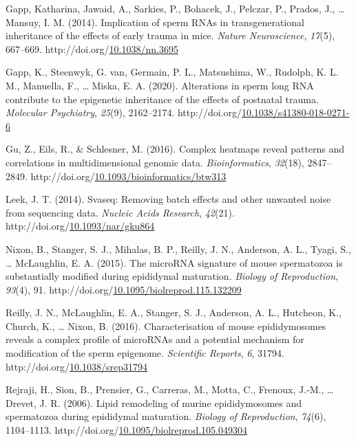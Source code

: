 \documentclass[12pt,twoside]{reedthesis}
\newlength{\cslhangindent}
\newenvironment{CSLReferences}[2] %
 {%
  \setlength{\parindent}{0pt}
  \ifodd #1 \everypar{\setlength{\hangindent}{\cslhangindent}}\ignorespaces\fi
  \ifnum #2 > 0
  \setlength{\parskip}{#2\baselineskip}
  \fi
 }%
 {}
\begin{document}
\begin{CSLReferences}{1}{0}
\leavevmode{}%
Gapp, Katharina, Jawaid, A., Sarkies, P., Bohacek, J., Pelczar, P., Prados, J., \ldots{} Mansuy, I. M. (2014). Implication of sperm {RNAs} in transgenerational inheritance of the effects of early trauma in mice. \emph{Nature Neuroscience}, \emph{17}(5), 667--669. http://doi.org/\href{https://doi.org/10.1038/nn.3695}{10.1038/nn.3695}

\leavevmode{}%
Gapp, K., Steenwyk, G. van, Germain, P. L., Matsushima, W., Rudolph, K. L. M., Manuella, F., \ldots{} Miska, E. A. (2020). Alterations in sperm long {RNA} contribute to the epigenetic inheritance of the effects of postnatal trauma. \emph{Molecular Psychiatry}, \emph{25}(9), 2162--2174. http://doi.org/\href{https://doi.org/10.1038/s41380-018-0271-6}{10.1038/s41380-018-0271-6}

\leavevmode{}%
Gu, Z., Eils, R., \& Schlesner, M. (2016). Complex heatmaps reveal patterns and correlations in multidimensional genomic data. \emph{Bioinformatics}, \emph{32}(18), 2847--2849. http://doi.org/\href{https://doi.org/10.1093/bioinformatics/btw313}{10.1093/bioinformatics/btw313}

\leavevmode{}%
Leek, J. T. (2014). Svaseq: Removing batch effects and other unwanted noise from sequencing data. \emph{Nucleic Acids Research}, \emph{42}(21). http://doi.org/\href{https://doi.org/10.1093/nar/gku864}{10.1093/nar/gku864}

\leavevmode{}%
Nixon, B., Stanger, S. J., Mihalas, B. P., Reilly, J. N., Anderson, A. L., Tyagi, S., \ldots{} McLaughlin, E. A. (2015). The {microRNA} signature of mouse spermatozoa is substantially modified during epididymal maturation. \emph{Biology of Reproduction}, \emph{93}(4), 91. http://doi.org/\href{https://doi.org/10.1095/biolreprod.115.132209}{10.1095/biolreprod.115.132209}

\leavevmode{}%
Reilly, J. N., McLaughlin, E. A., Stanger, S. J., Anderson, A. L., Hutcheon, K., Church, K., \ldots{} Nixon, B. (2016). Characterisation of mouse epididymosomes reveals a complex profile of {microRNAs} and a potential mechanism for modification of the sperm epigenome. \emph{Scientific Reports}, \emph{6}, 31794. http://doi.org/\href{https://doi.org/10.1038/srep31794}{10.1038/srep31794}

\leavevmode{}%
Rejraji, H., Sion, B., Prensier, G., Carreras, M., Motta, C., Frenoux, J.-M., \ldots{} Drevet, J. R. (2006). Lipid remodeling of murine epididymosomes and spermatozoa during epididymal maturation. \emph{Biology of Reproduction}, \emph{74}(6), 1104--1113. http://doi.org/\href{https://doi.org/10.1095/biolreprod.105.049304}{10.1095/biolreprod.105.049304}


\end{CSLReferences}
\end{document}
